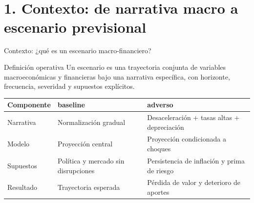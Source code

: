 \documentclass[10pt,aspectratio=169]{beamer}
\newcommand{\baseline}{\textcolor{MacropolTeal}{\textbf{baseline}}}
\newcommand{\adverso}{\textcolor{red!70!black}{\textbf{adverso}}}
\begin{document}
\section{1. Contexto: de narrativa macro a escenario previsional}

\begin{frame}{Contexto: ¿qué es un escenario macro-financiero?}
\begin{block}{Definición operativa}
Un escenario es una trayectoria conjunta de variables macroeconómicas y financieras bajo una narrativa específica, con horizonte, frecuencia, severidad y supuestos explícitos.
\end{block}

\begin{table}
\small
\begin{tabular}{p{3.2cm}p{4.2cm}p{4.2cm}}
\toprule
Componente & \baseline{} & \adverso{} \\
\midrule
Narrativa & Normalización gradual & Desaceleración + tasas altas + depreciación \\
Modelo & Proyección central & Proyección condicionada a choques \\
Supuestos & Política y mercado sin disrupciones & Persistencia de inflación y prima de riesgo \\
Resultado & Trayectoria esperada & Pérdida de valor y deterioro de aportes \\
\bottomrule
\end{tabular}
\end{table}
\end{frame}
\end{document}
